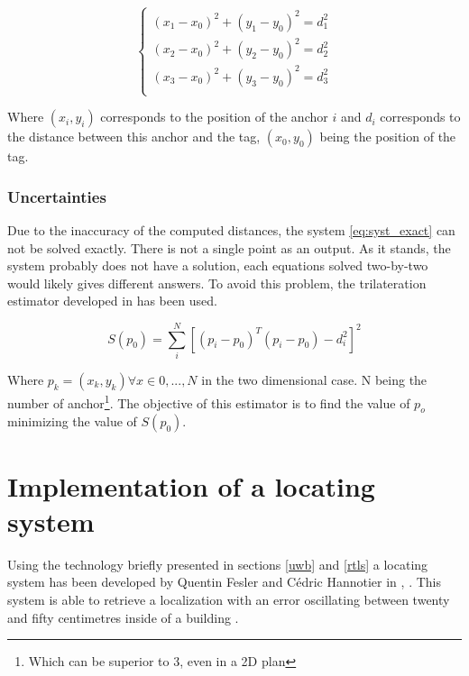 \begin{equation}
\label{eq:syst_exact}
\begin{cases}
(x_1 - x_0)^2 + (y_1 - y_0)^2 = d_1^2 \\
(x_2 - x_0)^2 + (y_2 - y_0)^2 = d_2^2 \\
(x_3 - x_0)^2 + (y_3 - y_0)^2 = d_3^2 \\
\end{cases}
\end{equation}

Where $(x_i, y_i)$ corresponds to the position of the anchor $i$ and $d_i$ corresponds to the distance between this anchor and the tag, $(x_0, y_0)$ being the position of the tag.

\subsubsection{Uncertainties}

Due to the inaccuracy of the computed distances, the system \ref{eq:syst_exact} can not be solved exactly. There is not a single point as an output. As it stands, the system probably does not have a solution, each equations solved two-by-two would likely gives different answers. To avoid this problem, the trilateration estimator developed in \cite{zhou2009efficient} has been used.

\begin{equation}
S(p_0) = \sum_i^N[(p_i - p_0)^T(p_i-p_0)-d_i^2]^2
\end{equation}

Where $p_k = (x_k, y_k) \forall x\in {0, ... , N}$ in the two dimensional case. N being the number of anchor\footnote{Which can be superior to 3, even in a 2D plan}. The objective of this estimator is to find the value of $p_o$ minimizing the value of $S(p_0)$.

\section{Implementation of a locating system}

Using the technology briefly presented in sections \ref{uwb} and \ref{rtls} a locating system has been developed by Quentin Fesler and Cédric Hannotier in  \cite{fesler2018high}, \cite{hannotier2019indoor}. This system is able to retrieve a localization with an error oscillating between twenty and fifty centimetres inside of a building \cite{guyard2019navigation}.
\vspace{2mm}

